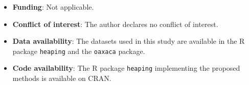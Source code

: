 \documentclass[pdflatex,sn-mathphys-num]{sn-jnl}%
\theoremstyle{thmstyleone}%
\theoremstyle{thmstyletwo}%
\theoremstyle{thmstylethree}%
\begin{document}
\begin{itemize}
\item \textbf{Funding}: Not applicable.
\item \textbf{Conflict of interest}: The author declares no conflict of interest.
\item \textbf{Data availability}: The datasets used in this study are available in the R package \texttt{heaping} and the \texttt{oaxaca} package.
\item \textbf{Code availability}: The R package \texttt{heaping} implementing the proposed methods is available on CRAN.
\end{itemize}


\end{document}
